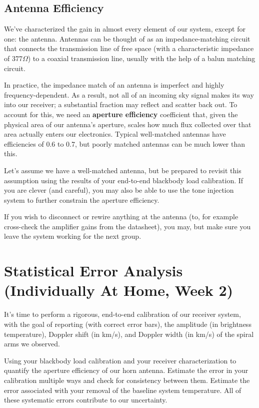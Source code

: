 \documentclass[11pt,preprint]{aastex}
\begin{document}
\subsection{Antenna Efficiency}

We've characterized the gain in almost every element of our system, except
for one: the antenna. Antennas can be thought of as an impedance-matching
circuit that connects the transmission line of free space (with a characteristic
impedance of 377$\Omega$) to a coaxial transmission line, usually with the
help of a balun matching circuit.

In practice, the impedance match of an antenna is imperfect and highly 
frequency-dependent. As a result, not all of an incoming sky signal makes its
way into our receiver; a substantial fraction may reflect and scatter back
out. To account for this, we need an {\bf aperture efficiency}
coefficient that, given the physical area of our antenna's aperture, 
scales how much flux collected over that area actually enters our electronics.
Typical well-matched antennas have efficiencies of 0.6 to 0.7, but poorly matched
antennas can be much lower than this.

Let's assume we have a well-matched antenna, but be prepared
to revisit this assumption using the results of your end-to-end blackbody load
calibration. If you are clever (and careful), you may also be able to use
the tone injection system to further constrain the aperture efficiency.

If you wish to disconnect or rewire anything at the antenna (to, for example
cross-check the amplifier gains from the datasheet), you may, but make
sure you leave the system working for the next group.

\section {Statistical Error Analysis (Individually At Home, Week 2)} \label{secondweek}
 
It's time to perform a rigorous, end-to-end calibration of our receiver system,
with the goal of reporting (with correct error bars), the amplitude (in
brightness temperature), Doppler shift (in km/s), and Doppler width (in km/s)
of the spiral arms we observed.

Using your blackbody load calibration and your receiver characterization
to quantify the aperture efficiency of our horn antenna. Estimate the error
in your calibration multiple ways and check for consistency between them.
Estimate the error associated with your removal of the baseline system temperature.
All of these systematic errors contribute to our uncertainty.
\end{document}
